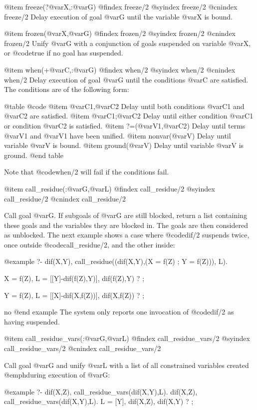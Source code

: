 {{{{{{{{{@item freeze(?@var{X},:@var{G})
@findex freeze/2
@syindex freeze/2
@cnindex freeze/2
Delay execution of goal @var{G} until the variable @var{X} is bound.

@item frozen(@var{X},@var{G})
@findex frozen/2
@syindex frozen/2
@cnindex frozen/2
Unify @var{G} with a conjunction of goals suspended on variable @var{X},
or @code{true} if no goal has suspended.

@item when(+@var{C},:@var{G})
@findex when/2
@syindex when/2
@cnindex when/2
Delay execution of goal @var{G} until the conditions @var{C} are
satisfied. The conditions are of the following form:

@table @code
@item @var{C1},@var{C2}
Delay until both conditions @var{C1} and @var{C2} are satisfied.
@item @var{C1};@var{C2}
Delay until either condition @var{C1} or condition @var{C2} is satisfied.
@item ?=(@var{V1},@var{C2})
Delay until terms @var{V1} and @var{V1} have been unified.
@item nonvar(@var{V})
Delay until variable @var{V} is bound.
@item ground(@var{V})
Delay until variable @var{V} is ground.
@end table

Note that @code{when/2} will fail if the conditions fail.

@item call_residue(:@var{G},@var{L})
@findex call_residue/2
@syindex call_residue/2
@cnindex call_residue/2

Call goal @var{G}. If subgoals of @var{G} are still blocked, return
a list containing these goals and the variables they are blocked in. The
goals are then considered as unblocked. The next example shows a case
where @code{dif/2} suspends twice, once outside @code{call_residue/2},
and the other inside:

@example
?- dif(X,Y),
       call_residue((dif(X,Y),(X = f(Z) ; Y = f(Z))), L).

X = f(Z),
L = [[Y]-dif(f(Z),Y)],
dif(f(Z),Y) ? ;

Y = f(Z),
L = [[X]-dif(X,f(Z))],
dif(X,f(Z)) ? ;

no
@end example
The system only reports one invocation of @code{dif/2} as having
suspended. 

@item call_residue_vars(:@var{G},@var{L})
@findex call_residue_vars/2
@syindex call_residue_vars/2
@cnindex call_residue_vars/2

Call goal @var{G} and unify @var{L} with a list of all constrained variables created @emph{during} execution of @var{G}:

@example
  ?- dif(X,Z), call_residue_vars(dif(X,Y),L).
dif(X,Z), call_residue_vars(dif(X,Y),L).
L = [Y],
dif(X,Z),
dif(X,Y) ? ;

}}}}}}}}}
